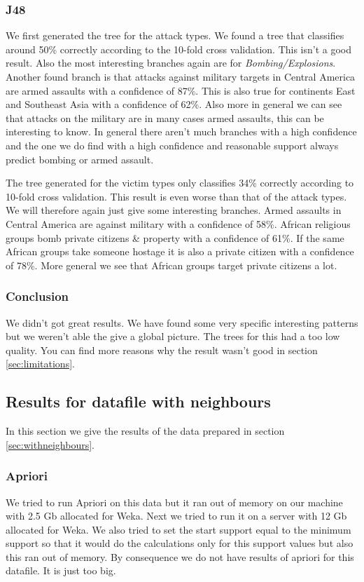 \documentclass[a4]{article}
\begin{document}
\subsubsection{J48}
We first generated the tree for the attack types. We found a tree that classifies around 50\% correctly according to the 10-fold cross validation. This isn't a good result. Also the most interesting branches again are for \textit{Bombing/Explosions}. Another found branch is that attacks against military targets in Central America are armed assaults with a confidence of 87\%. This is also true for continents East and Southeast Asia with a confidence of 62\%. Also more in general we can see that attacks on the military are in many cases armed assaults, this can be interesting to know. In general there aren't much branches with a high confidence and the one we do find with a high confidence and reasonable support always predict bombing or armed assault.\par
The tree generated for the victim types only classifies 34\% correctly according to 10-fold cross validation. This result is even worse than that of the attack types. We will therefore again just give some interesting branches. Armed assaults in Central America are against military with a confidence of 58\%. African religious groups bomb private citizens \& property with a confidence of 61\%. If the same African groups take someone hostage it is also a private citizen with a confidence of 78\%. More general we see that African groups target private citizens a lot.
\subsubsection{Conclusion}
We didn't got great results. We have found some very specific interesting patterns but we weren't able the give a global picture. The trees for this had a too low quality. You can find more reasons why the result wasn't good in section \ref{sec:limitations}. 
\subsection{Results for datafile with neighbours}
In this section we give the results of the data prepared in section \ref{sec:withneighbours}.
\subsubsection{Apriori}
\label{sec:apriori_3}
We tried to run Apriori on this data but it ran out of memory on our machine with 2.5 Gb allocated for Weka. Next we tried to run it on a server with 12 Gb allocated for Weka. We also tried to set the start support equal to the minimum support so that it would do the calculations only for this support values but also this ran out of memory. By consequence we do not have results of apriori for this datafile. It is just too big.
\end{document}
